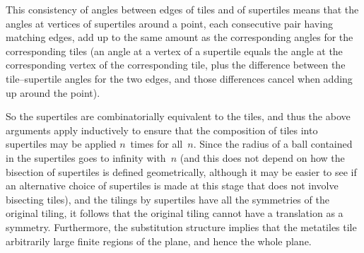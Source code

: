 This consistency of angles between edges of tiles and of supertiles
means that the angles at vertices of supertiles around a point, each
consecutive pair having matching edges, add up to the same amount as
the corresponding angles for the corresponding tiles (an angle at a
vertex of a supertile equals the angle at the corresponding vertex of
the corresponding tile, plus the difference between the
tile--supertile angles for the two edges, and those differences cancel
when adding up around the point).

So the supertiles are combinatorially equivalent to the tiles, and thus
the above arguments apply inductively to ensure that the composition
of tiles into supertiles may be applied $n$~times for all~$n$.  Since
the radius of a ball contained in the supertiles goes to infinity
with~$n$ (and this does not depend on how the bisection of supertiles
is defined geometrically, although it may be easier to see if an
alternative choice of supertiles is made at this stage that does not
involve bisecting tiles), and the tilings by supertiles have all the
symmetries of the original tiling, it follows that the original tiling
cannot have a translation as a symmetry.  Furthermore, the
substitution structure implies that the metatiles tile arbitrarily
large finite regions of the plane, and hence the whole plane.
